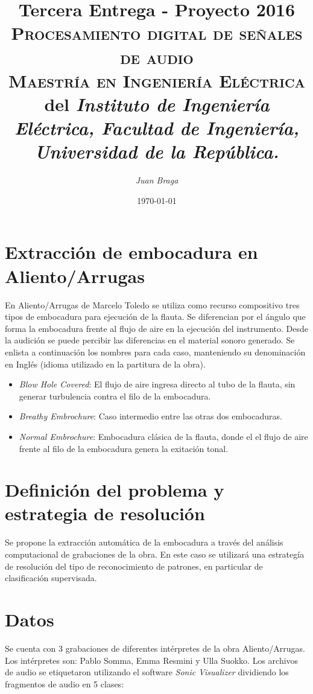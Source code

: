 \documentclass{article}
\title{\textbf{Tercera Entrega - Proyecto 2016}\\\large \textsc{Procesamiento digital de señales de audio}\\
 \textsc{Maestría en Ingeniería Eléctrica} del \textit{Instituto de Ingeniería Eléctrica, Facultad de Ingeniería, Universidad de la República.}}
\author{\textit{Juan Braga}}
\date{\today}
\begin{document}
\maketitle 


\section*{Extracción de embocadura en Aliento/Arrugas}
En Aliento/Arrugas de Marcelo Toledo se utiliza como recurso compositivo tres tipos de embocadura para ejecución de la flauta. Se diferencian por el ángulo que forma la embocadura frente al flujo de aire en la ejecución del instrumento. Desde la audición se puede percibir las diferencias en el material sonoro generado. Se enlista a continuación los nombres para cada caso, manteniendo su denominación en Inglés (idioma utilizado en la partitura de la obra).

\begin{itemize} 
  \item \textit{Blow Hole Covered}: El flujo de aire ingresa directo al tubo de la flauta, sin generar turbulencia contra el filo de la embocadura. 
  \item \textit{Breathy Embrochure}: Caso intermedio entre las otras dos embocaduras. 
  \item \textit{Normal Embrochure}: Embocadura clásica de la flauta, donde el el flujo de aire frente al filo de la embocadura genera la exitación tonal.
\end{itemize}
\medskip

\section*{Definición del problema y estrategia de resolución}
Se propone la extracción automática de la embocadura a través del análisis computacional de grabaciones de la obra. En este caso se utilizará una estrategía de resolución del tipo de reconocimiento de patrones, en particular de clasificación supervisada.

\section*{Datos}
Se cuenta con 3 grabaciones de diferentes intérpretes de la obra Aliento/Arrugas. Los intérpretes son: Pablo Somma, Emma Resmini y Ulla Suokko. Los archivos de audio se etiquetaron utilizando el software \textit{Sonic Visualizer} dividiendo los fragmentos de audio en 5 clases:
\end{document}
